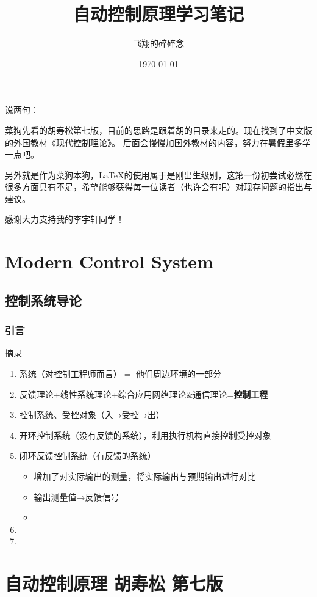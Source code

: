 \documentclass[oneside,a4paper]{ctexbook}
\title{自动控制原理学习笔记}
\author{飞翔的碎碎念}
\date{\today}
\begin{document}
\maketitle

说两句：

菜狗先看的胡寿松第七版，目前的思路是跟着胡的目录来走的。现在找到了中文版的外国教材《现代控制理论》。
后面会慢慢加国外教材的内容，努力在暑假里多学一点吧。

另外就是作为菜狗本狗，\LaTeX 的使用属于是刚出生级别，这第一份初尝试必然在很多方面具有不足，希望能够获得每一位读者（也许会有吧）对现存问题的指出与建议。

感谢大力支持我的李宇轩同学！

\tableofcontents


\part{Modern Control System}
\chapter{控制系统导论}
\section{引言}
摘录
\begin{enumerate}
    \item 系统（对控制工程师而言）$=$ 他们周边环境的一部分
    \item 反馈理论+线性系统理论+综合应用网络理论\&通信理论=\textbf{控制工程}
    \item 控制系统、受控对象（入→受控→出）
    \item 开环控制系统（没有反馈的系统），利用执行机构直接控制受控对象
    \item 闭环反馈控制系统（有反馈的系统）
    \begin{itemize}
        \item 增加了对实际输出的测量，将实际输出与预期输出进行对比
        \item 输出测量值→反馈信号
        \item 
    \end{itemize}
    \item 
    \item 
\end{enumerate}


\part{自动控制原理 胡寿松 第七版}
\end{document}

